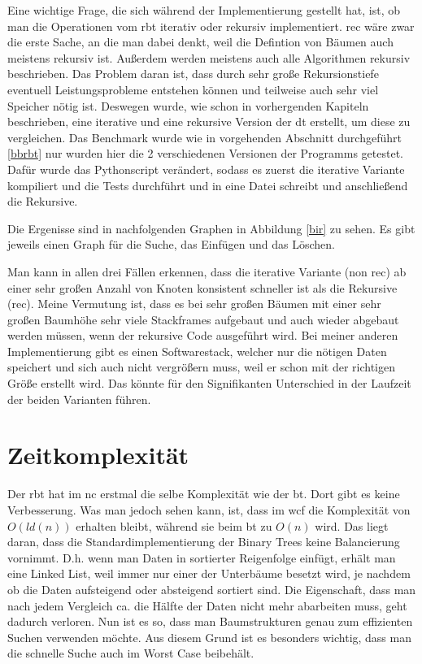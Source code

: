 \documentclass[11pt]{article}
\begin{document}
Eine wichtige Frage, die sich während der Implementierung gestellt hat, ist, ob man die Operationen vom \gls{rbt} iterativ oder rekursiv implementiert. 
\gls{rec} wäre zwar die erste Sache, an die man dabei denkt, weil die Defintion von Bäumen auch meistens rekursiv ist. Außerdem werden meistens auch alle Algorithmen rekursiv beschrieben. 
Das Problem daran ist, dass durch sehr große Rekursionstiefe eventuell Leistungsprobleme entstehen können und teilweise auch sehr viel Speicher nötig ist. 
Deswegen wurde, wie schon in vorhergenden Kapiteln beschrieben, eine iterative und eine rekursive Version der \gls{dt} erstellt, um diese zu vergleichen.
Das Benchmark wurde wie in vorgehenden Abschnitt durchgeführt \ref{bbrbt} nur wurden hier die 2 verschiedenen Versionen der Programms getestet. 
Dafür wurde das Pythonscript verändert, sodass es zuerst die iterative Variante kompiliert und die Tests durchführt und in eine Datei schreibt und anschließend die Rekursive. 

Die Ergenisse sind in nachfolgenden Graphen in Abbildung \ref{bir} zu sehen. Es gibt jeweils einen Graph für die Suche, das Einfügen und das Löschen.

Man kann in allen drei Fällen erkennen, dass die iterative Variante (non rec) ab einer sehr großen Anzahl von Knoten konsistent schneller ist als die Rekursive (rec).
Meine Vermutung ist, dass es bei sehr großen Bäumen mit einer sehr großen Baumhöhe sehr viele Stackframes aufgebaut und auch wieder abgebaut werden müssen, wenn der rekursive Code ausgeführt wird.
Bei meiner anderen Implementierung gibt es einen Softwarestack, welcher nur die nötigen Daten speichert und sich auch nicht vergrößern muss, weil er schon mit der richtigen Größe erstellt wird.
Das könnte für den Signifikanten Unterschied in der Laufzeit der beiden Varianten führen.

\section{Zeitkomplexität} \label{time}

Der \gls{rbt} hat im \gls{nc} erstmal die selbe Komplexität wie der \gls{bt}. Dort gibt es keine Verbesserung.
Was man jedoch sehen kann, ist, dass im \gls{wcf} die Komplexität von $O(ld(n))$ erhalten bleibt, während sie beim \gls{bt} zu $O(n)$ wird.
Das liegt daran, dass die Standardimplementierung der Binary Trees keine Balancierung vornimmt. D.h. wenn man Daten in sortierter Reigenfolge einfügt, 
erhält man eine Linked List, weil immer nur einer der Unterbäume besetzt wird, je nachdem ob die Daten aufsteigend oder absteigend sortiert sind. Die Eigenschaft, 
dass man nach jedem Vergleich ca. die Hälfte der Daten nicht mehr abarbeiten muss, geht dadurch verloren. 
Nun ist es so, dass man Baumstrukturen genau zum effizienten Suchen verwenden möchte. Aus diesem Grund ist es besonders wichtig, dass man die schnelle Suche auch im Worst Case beibehält.
\end{document}
